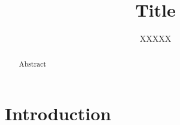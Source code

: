 \documentclass{memoir}
\title{Title}
\author{XXXXX}
\begin{document}
\maketitle

\begin{abstract}
    Abstract
\end{abstract}

\section{Introduction}
\end{document}
